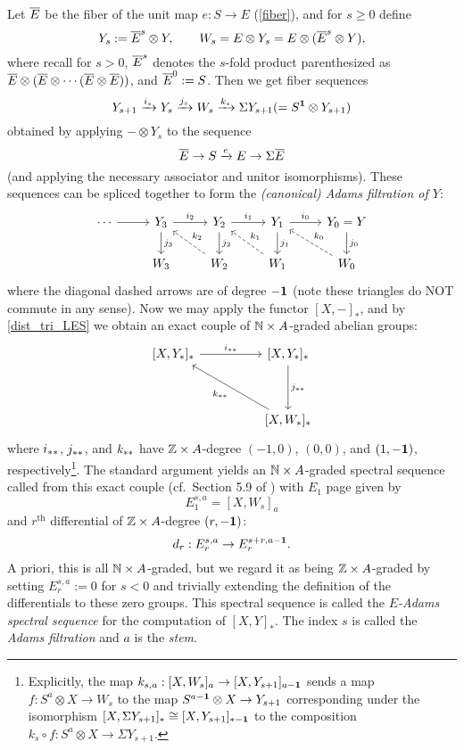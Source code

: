 \documentclass[../main.tex]{subfiles}
\begin{document}
\begin{definition}\label{mASS}
	Let $\overline E$ be the fiber of the unit map $e:S\to E$ (\autoref{fiber}), and for $s\geq0$ define
	\[Y_s:=\overline E^s\otimes Y,\qquad W_s = E\otimes Y_s=E\otimes(\overline E^s\otimes Y),\]
	where recall for $s>0$, $\overline E^s$ denotes the $s$-fold product parenthesized as $\overline E\otimes(\overline E\otimes\cdots(\overline E\otimes\overline E))$, and $\overline E^0:=S$. Then we get fiber sequences
	\[Y_{s+1}\xrightarrow{i_s}Y_s\xrightarrow{j_s} W_s\xrightarrow{k_s}\Sigma Y_{s+1}(=S^{\mathbf{1}}\otimes Y_{s+1})\]
	obtained by applying $-\otimes Y_s$ to the sequence
	\[\overline E\to S\xrightarrow eE\to\Sigma\overline E\]
	(and applying the necessary associator and unitor isomorphisms). These sequences can be spliced together to form the \emph{(canonical) Adams filtration of $Y$}:
	\[\begin{tikzcd}
		\cdots & {Y_3} & {Y_2} & {Y_1} & {Y_0=Y} \\
		& {W_3} & {W_2} & {W_1} & {W_0}
		\arrow[from=1-1, to=1-2]
		\arrow["{i_2}", from=1-2, to=1-3]
		\arrow["{i_1}", from=1-3, to=1-4]
		\arrow["{i_0}", from=1-4, to=1-5]
		\arrow["{j_0}", from=1-5, to=2-5]
		\arrow["{k_0}"', dashed, from=2-5, to=1-4]
		\arrow["{j_1}", from=1-4, to=2-4]
		\arrow["{k_1}"', dashed, from=2-4, to=1-3]
		\arrow["{j_3}", from=1-2, to=2-2]
		\arrow["{j_2}", from=1-3, to=2-3]
		\arrow["{k_2}"', dashed, from=2-3, to=1-2]
	\end{tikzcd}\]
	where the diagonal dashed arrows are of degree $-\mathbf{1}$ (note these triangles do NOT commute in any sense). Now we may apply the functor $[X,-]_\ast$, and by \autoref{dist_tri_LES} we obtain an exact couple of $\mathbb{N}\times A$-graded abelian groups:
	\[\begin{tikzcd}
		{[X,Y_\ast]_\ast} && {[X,Y_\ast]_\ast} \\
		\\
		&& {[X,W_\ast]_\ast}
		\arrow["{i_\aast}", from=1-1, to=1-3]
		\arrow["{j_\aast}", from=1-3, to=3-3]
		\arrow["{k_\aast}", from=3-3, to=1-1]
	\end{tikzcd}\]
	where $i_{\ast\ast}$, $j_{\ast\ast}$, and $k_{\ast\ast}$ have $\mathbb{Z}\times A$-degree $(-1,0)$, $(0,0)$, and $(1,-\mathbf{1})$, respectively\footnote{Explicitly, the map $k_{s,a}:[X,W_s]_a\to [X,Y_{s+1}]_{a-\mathbf{1}}$ sends a map $f:S^a\otimes X\to W_s$ to the map $S^{a-\mathbf{1}}\otimes X\to Y_{s+1}$ corresponding under the isomorphism $[X,\Sigma Y_{s+1}]_\ast\cong[X,Y_{s+1}]_{\ast-\mathbf{1}}$ to the composition $k_s\circ f:S^a\otimes X\to\Sigma Y_{s+1}$.}. The standard argument yields an $\mathbb{N}\times A$-graded spectral sequence called from this exact couple (cf.\ Section 5.9 of \cite{Weibel_1994}) with $E_1$ page given by 
	\[E_1^{s,a}=[X,W_s]_{a}\]
	and $r^\text{th}$ differential of $\mathbb{Z}\times A$-degree $(r,-\mathbf{1})$:
	\[d_r:E_r^{s,a}\to E_r^{s+r,a-\mathbf{1}}.\]
	A priori, this is all $\mathbb{N}\times A$-graded, but we regard it as being $\mathbb{Z}\times A$-graded by setting $E_r^{s,a}:=0$ for $s<0$ and trivially extending the definition of the differentials to these zero groups. This spectral sequence is called the \emph{$E$-Adams spectral sequence} for the computation of $[X,Y]_\ast$. The index $s$ is called the \emph{Adams filtration} and $a$ is the \emph{stem}.
\end{definition}
\end{document}
